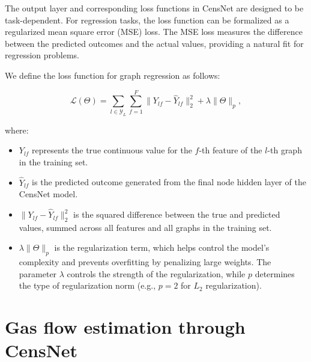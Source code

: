 The output layer and corresponding loss functions in CensNet are designed to be task-dependent. For regression tasks, the loss function can be formalized as a regularized mean square error (MSE) loss. The MSE loss measures the difference between the predicted outcomes and the actual values, providing a natural fit for regression problems.


We define the loss function for graph regression as follows:

\begin{equation}
    \mathcal{L}(\Theta) = \sum_{l \in \mathcal{Y}_L} \sum_{f=1}^{F} \| Y_{lf} - \hat{Y}_{lf} \|^2_2 + \lambda \|\Theta\|_p,
\end{equation}

where:

\begin{itemize}
    \item \( Y_{lf} \) represents the true continuous value for the \( f \)-th feature of the \( l \)-th graph in the training set.
    \item \( \hat{Y}_{lf} \) is the predicted outcome generated from the final node hidden layer of the CensNet model.
    \item \( \| Y_{lf} - \hat{Y}_{lf} \|^2_2 \) is the squared difference between the true and predicted values, summed across all features and all graphs in the training set.
    \item \( \lambda \|\Theta\|_p \) is the regularization term, which helps control the model's complexity and prevents overfitting by penalizing large weights. The parameter \( \lambda \) controls the strength of the regularization, while \( p \) determines the type of regularization norm (e.g., \( p=2 \) for \( L_2 \) regularization).
\end{itemize}



\section{Gas flow estimation through CensNet} \label{sec:LinealCensnet_formulation}


